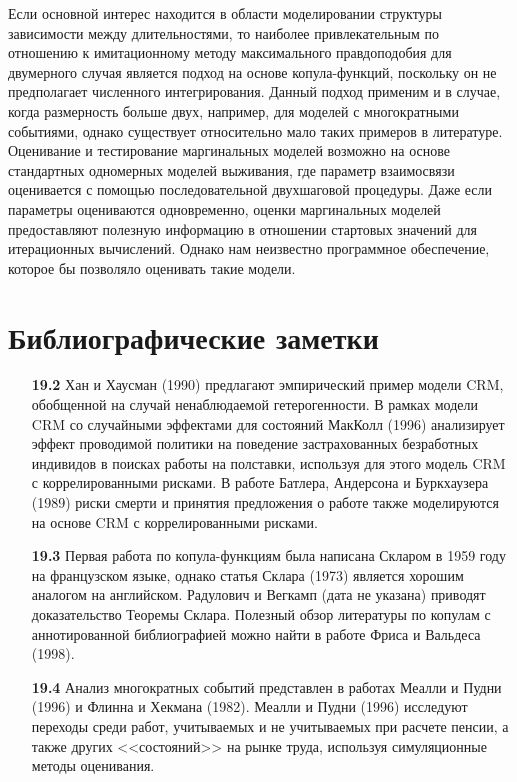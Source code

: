 Если основной интерес находится в области моделировании структуры зависимости между длительностями, то наиболее привлекательным по отношению к имитационному методу максимального правдоподобия для двумерного случая является подход на основе копула-функций, поскольку он не предполагает численного интегрирования. Данный подход применим и в случае, когда размерность больше двух, например, для моделей с многократными событиями, однако существует относительно мало таких примеров в литературе. Оценивание и тестирование маргинальных моделей возможно на основе стандартных одномерных моделей выживания, где параметр взаимосвязи оценивается с помощью последовательной двухшаговой процедуры. Даже если параметры оцениваются одновременно, оценки маргинальных моделей предоставляют полезную информацию в отношении стартовых значений для итерационных вычислений. Однако нам неизвестно программное обеспечение, которое бы позволяло оценивать такие модели.




\section{Библиографические заметки}\label{sec:19.7}

\begin{itemize}

    \item[\textbf{19.2}]
Хан и Хаусман (1990) предлагают эмпирический пример модели CRM, обобщенной на случай ненаблюдаемой гетерогенности.
В рамках модели CRM со случайными эффектами для состояний МакКолл (1996) анализирует эффект проводимой политики на поведение застрахованных безработных индивидов в поисках работы на полставки, используя для этого модель CRM с коррелированными рисками. В работе Батлера, Андерсона и Буркхаузера (1989) риски смерти и принятия предложения о работе также моделируются на основе CRM с коррелированными рисками.

    \item[\textbf{19.3}]
Первая работа по копула-функциям была написана Скларом в 1959 году на французском языке, однако статья Склара (1973) является хорошим аналогом на английском. Радулович и Вегкамп (дата не указана) приводят доказательство Теоремы Склара. Полезный обзор литературы по копулам с аннотированной библиографией можно найти в работе Фриса и Вальдеса (1998).

    \item[\textbf{19.4}]
Анализ многократных событий представлен в работах Меалли и Пудни (1996) и Флинна и Хекмана (1982). Меалли и Пудни (1996) исследуют переходы среди работ, учитываемых и не учитываемых при расчете пенсии, а также других <<состояний>> на рынке труда, используя симуляционные методы оценивания.

\end{itemize}


